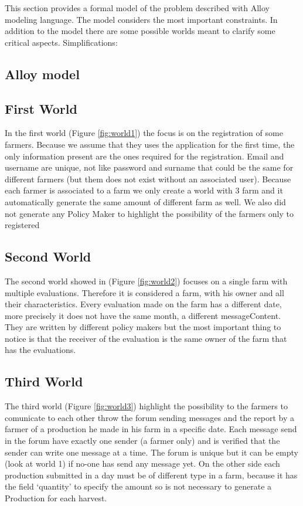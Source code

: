 
This section provides a formal model of the problem described with Alloy modeling language. 
The model considers the most important constraints. In addition to the model there are some 
possible worlds meant to clarify some critical aspects.
Simplifications: 

\subsection{Alloy model}


\subsection{First World}
In the first world (Figure \ref{fig:world1}) the focus is on the registration of some farmers. Because we assume that they uses the application for the first time, the only information present are the ones required for the registration. Email and username are unique, not like password and surname that could be the same for different farmers (but them does not exist without an associated user). 
Because each farmer is associated to a farm we only create a world with 3 farm and it automatically generate the same amount of different farm as well. We also did not generate any Policy Maker to highlight the possibility of the farmers only to registered



\subsection{Second World}
The second world showed in (Figure \ref{fig:world2}) focuses on a single farm with multiple evaluations. Therefore it is considered a farm, with his owner and all their characteristics. Every evaluation made on the farm has a different date, more precisely it does not have the same month, a different messageContent. They are written by different policy makers but the most important thing to notice is that the receiver of the evaluation is the same owner of the farm that has the evaluations.


\subsection{Third World}
The third world (Figure \ref{fig:world3}) highlight the possibility to the farmers to comunicate to each other throw the forum sending messages and the report by a farmer of a production he made in his farm in a specific date. Each message send in the forum have exactly  one sender (a farmer only) and is verified that the sender can write one message at a time.  The forum is unique but it can be empty (look at world 1) if no-one has send any message yet. On the other side each production submitted in a day must be of different type in a farm, because it has the field ‘quantity’ to specify the amount so is not necessary to generate a Production for each harvest.

